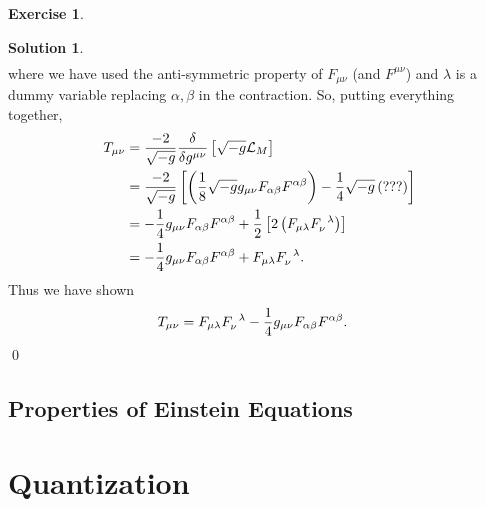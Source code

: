 \documentclass[a4paper,11pt]{article}
\numberwithin{equation}{section}
\theoremstyle{definition}
\newtheorem{exmp}{Exercise}[section]
\newtheorem{sln}{Solution}[section]
\newcommand{\lag}{\mathcal{L}}
\newcommand{\nn}{\nonumber}
\newcommand{\f}[2]{\frac{#1}{#2}}
\newcommand{\lp}{\left(}
\newcommand{\rp}{\right)}
\newcommand{\lb}{\left[}
\newcommand{\rb}{\right]}
\begin{document}
\begin{exmp}
\begin{sln}
\begin{align}
		\end{align}
		where we have used the anti-symmetric property of $F_{\mu\nu}$ (and $F^{\mu\nu}$) and $\lambda$ is a dummy variable replacing $\alpha, \beta$ in the contraction. So, putting everything together,
		\begin{align}
		T_{\mu\nu} &= \f{-2}{\sqrt{-g}}\f{\delta}{\delta g^{\mu\nu}} \lb \sqrt{-g}\lag_M \rb\nn\\
		&= \f{-2}{\sqrt{-g}}\lb \lp \f{1}{8}\sqrt{-g}g_{\mu\nu} F_{\alpha\beta}F^{\alpha\beta} \rp -\f{1}{4}\sqrt{-g}\lp ???  \rp\rb\nn\\
		&= -\f{1}{4}g_{\mu\nu}F_{\alpha\beta}F^{\alpha\beta} + \f{1}{2}\lb 2\lp F_{\mu\lambda} \tensor{F}{_\nu^\lambda} \rp \rb\nn\\
		&=  -\f{1}{4}g_{\mu\nu}F_{\alpha\beta}F^{\alpha\beta} + F_{\mu\lambda}\tensor{F}{_\nu^\lambda}.
		\end{align}
		Thus we have shown
		\begin{align}
		T_{\mu\nu} &= F_{\mu\lambda}\tensor{F}{_\nu^\lambda} -\f{1}{4}g_{\mu\nu}F_{\alpha\beta}F^{\alpha\beta}.
		\end{align}
		\qed \\
	\end{sln}
\end{exmp}


\subsection{Properties of Einstein Equations}

\newpage



\section{Quantization}

\newpage
\end{document}
